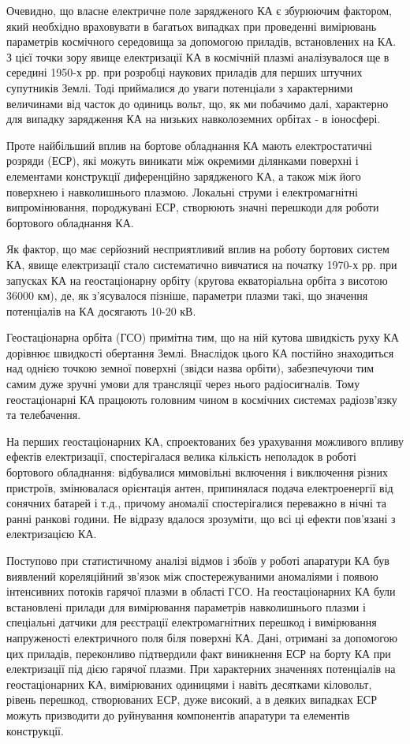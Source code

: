 \documentclass[a4paper,12pt]{article}
\begin{document}
Очевидно, що власне електричне поле зарядженого КА є збурюючим фактором, який необхідно враховувати в багатьох випадках при проведенні вимірювань параметрів космічного середовища за допомогою приладів, встановлених на КА. З цієї точки зору явище електризації КА в космічній плазмі аналізувалося ще в середині 1950-х рр. при розробці наукових приладів для перших штучних супутників Землі. Тоді приймалися до уваги потенціали з характерними величинами від часток до одиниць вольт, що, як ми побачимо далі, характерно для випадку зарядження КА на низьких навколоземних орбітах - в іоносфері.

Проте найбільший вплив на бортове обладнання КА мають електростатичні розряди (ЕСР), які можуть виникати між окремими ділянками поверхні і елементами конструкції диференційно зарядженого КА, а також між його поверхнею і навколишнього плазмою. Локальні струми і електромагнітні випромінювання, породжувані ЕСР, створюють значні перешкоди для роботи бортового обладнання КА.

Як фактор, що має серйозний несприятливий вплив на роботу бортових систем КА, явище електризації стало систематично вивчатися на початку 1970-х рр. при запусках КА на геостаціонарну орбіту (кругова екваторіальна орбіта з висотою ~ 36000 км), де, як з'ясувалося пізніше, параметри плазми такі, що значення потенціалів на КА досягають 10-20 кВ.

Геостаціонарна орбіта (ГСО) примітна тим, що на ній кутова швидкість руху КА дорівнює швидкості обертання Землі. Внаслідок цього КА постійно знаходиться над однією точкою земної поверхні (звідси назва орбіти), забезпечуючи тим самим дуже зручні умови для трансляції через нього радіосигналів. Тому геостаціонарні КА працюють головним чином в космічних системах радіозв'язку та телебачення.

На перших геостаціонарних КА, спроектованих без урахування можливого впливу ефектів електризації, спостерігалася велика кількість неполадок в роботі бортового обладнання: відбувалися мимовільні включення і виключення різних пристроїв, змінювалася орієнтація антен, припинялася подача електроенергії від сонячних батарей і т.д., причому аномалії спостерігалися переважно в нічні та ранні ранкові години. Не відразу вдалося зрозуміти, що всі ці ефекти пов'язані з електризацією КА.

Поступово при статистичному аналізі відмов і збоїв у роботі апаратури КА був виявлений кореляційний зв'язок між спостережуваними аномаліями і появою інтенсивних потоків гарячої плазми в області ГСО. На геостаціонарних КА були встановлені прилади для вимірювання параметрів навколишнього плазми і спеціальні датчики для реєстрації електромагнітних перешкод і вимірювання напруженості електричного поля біля поверхні КА. Дані, отримані за допомогою цих приладів, переконливо підтвердили факт виникнення ЕСР на борту КА при електризації під дією гарячої плазми. При характерних значеннях потенціалів на геостаціонарних КА, вимірюваних одиницями і навіть десятками кіловольт, рівень перешкод, створюваних ЕСР, дуже високий, а в деяких випадках ЕСР можуть призводити до руйнування компонентів апаратури та елементів конструкції.
\end{document}
